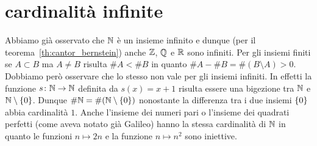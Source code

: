 \begin{comment}
Se fosse $z^2 > y$ vorremmo dimostrare che esiste $\eps>0$ tale che
$(z-\eps)^2 \ge y$.
Questo succede se $(z-\eps)^2 = z^2 - 2\eps z + \eps^2 \ge y$.
E' quindi sufficiente che sia $z^2 - 2 \eps z \ge y$ ovvero basta scegliere
\[
  \eps = \frac{z^2-y}{2z}.
\]
Ma allora se $(z-\eps)^2\ge y$ si ha $z-\eps \in B$ e dunque non può
essere $z \le B$.

Rimane dunque l'unica possibilità che sia $z^2 = y$, come volevamo dimostrare.

Se ci fosse un altro $w\ge 0$ tale che $w^2 = y$ si avrebbe $w^2 - z^2=0$ ovvero
$(w-z)(w+z)=0$ da cui (ricordando che $z>0$ e quindi $w+z\neq 0$)
si ottiene $w-z=0$. Dunque $w=z$.
\end{proof}

Abbiamo quindi dimostrato che $\sqrt{2} \in \RR \setminus \QQ$
(diremo che $\sqrt 2$ è
\myemph{irrazionale}%
\index{numero!irrazionale}%
) e dunque $\RR \neq \QQ$.
Questo significa che $\QQ$ è un esempio di campo ordinato che però
non soddisfa l'assioma di continuità infatti se consideriamo i due insiemi:
\[
 A = \ENCLOSE{x\in \QQ \colon x\ge 0, x^2 \le 2},\qquad
 B = \ENCLOSE{x\in \QQ \colon x\ge 0, x^2 \ge 2}
\]
si può verificare che $A$ e $B$ sono non vuoti e che $A \le B$,
come abbiamo fatto nel teorema precedente.
E' quindi chiaro che in $\RR$ l'unico elemento di separazione
è $\sqrt 2$ e visto che $\sqrt 2\not \in \QQ$ (teorema~\ref{th:pitagora})
deduciamo che in $\QQ$ questi due insiemi non hanno elemento di separazione.

\section{estremo superiore}
\end{comment}

\section{cardinalità infinite}

Abbiamo già osservato che $\mathbb N$ è un insieme infinito e dunque (per il teorema~\ref{th:cantor_bernstein})
anche $\mathbb Z$, $\mathbb Q$ e $\mathbb R$ sono infiniti.
Per gli insiemi finiti se $A\subset B$ ma $A\neq B$ risulta $\#A < \# B$
in quanto $\#A - \#B = \#(B\setminus A) > 0$. 
Dobbiamo però osservare che lo stesso non vale per gli insiemi infiniti.
In effetti la funzione $s\colon \mathbb N \to \mathbb N$ definita da $s(x)=x+1$
risulta essere una bigezione tra $\mathbb N$ e $\mathbb N\setminus{\left\{ 0 \right\}}$. 
Dunque $\#\mathbb N = \#(\mathbb N\setminus{\left\{ 0 \right\}})$ 
nonostante la differenza tra i due insiemi ${\left\{ 0 \right\}}$ abbia 
cardinalità $1$. 
Anche l'insieme dei numeri pari o l'insieme 
dei quadrati perfetti (come aveva notato già Galileo)
hanno la stessa cardinalità di $\mathbb N$ in quanto le funzioni $n\mapsto 2n$
e la funzione $n\mapsto n^2$ sono iniettive.

